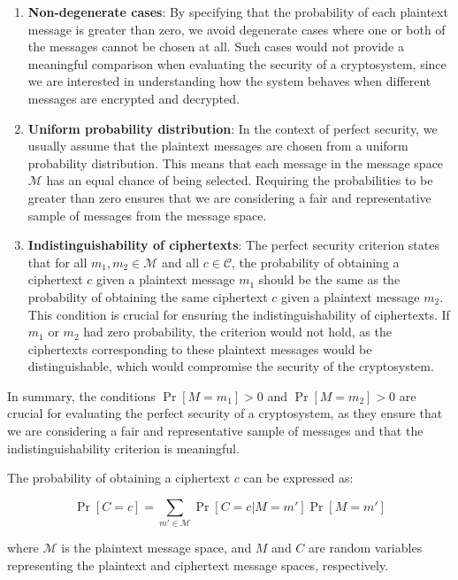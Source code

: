 \documentclass[12pt,openany]{book}
\theoremstyle{definition}
\begin{document}
	\begin{enumerate}
		\item 
		\textbf{Non-degenerate cases}: By specifying that the probability of each plaintext message is greater than zero, we avoid degenerate cases where one or both of the messages cannot be chosen at all. Such cases would not provide a meaningful comparison when evaluating the security of a cryptosystem, since we are interested in understanding how the system behaves when different messages are encrypted and decrypted.
		\item
		\textbf{Uniform probability distribution}: In the context of perfect security, we usually assume that the plaintext messages are chosen from a uniform probability distribution. This means that each message in the message space $\mathcal{M}$ has an equal chance of being selected. Requiring the probabilities to be greater than zero ensures that we are considering a fair and representative sample of messages from the message space.
		\item 
		\textbf{Indistinguishability of ciphertexts}: The perfect security criterion states that for all $m_1, m_2 \in \mathcal{M}$ and all $c \in \mathcal{C}$, the probability of obtaining a ciphertext $c$ given a plaintext message $m_1$ should be the same as the probability of obtaining the same ciphertext $c$ given a plaintext message $m_2$. This condition is crucial for ensuring the indistinguishability of ciphertexts. If $m_1$ or $m_2$ had zero probability, the criterion would not hold, as the ciphertexts corresponding to these plaintext messages would be distinguishable, which would compromise the security of the cryptosystem.
	\end{enumerate}
	
	
	In summary, the conditions $\Pr[M = m_1] > 0$ and $\Pr[M = m_2] > 0$ are crucial for evaluating the perfect security of a cryptosystem, as they ensure that we are considering a fair and representative sample of messages and that the indistinguishability criterion is meaningful.
	
	\newpage
	The probability of obtaining a ciphertext $c$ can be expressed as:
	
	\begin{equation}
	\Pr[C = c] = \sum_{m' \in \mathcal{M}} \Pr[C = c | M = m']\Pr[M = m']
	\end{equation}
	
	\noindent where $\mathcal{M}$ is the plaintext message space, and $M$ and $C$ are random variables representing the plaintext and ciphertext message spaces, respectively.
	
\end{document}
